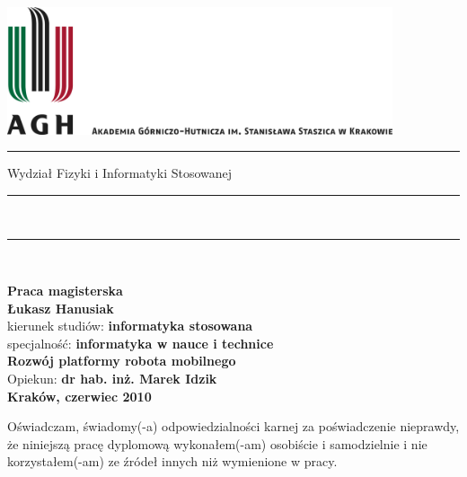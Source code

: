 \documentclass[a4paper,12pt]{article}
\begin{document}
\thispagestyle{empty}
\includegraphics[height=37.5mm]{../images/agh_nzw_a_pl_1w_wbr_rgb_150ppi.jpg}\\
\rule{30mm}{0pt}
{\large \textsf{Wydział Fizyki i Informatyki Stosowanej}}\\
\rule{\textwidth}{3pt}\\
\rule[2ex]
{\textwidth}{1pt}\\
\vspace{7ex}
\begin{center}
{\LARGE \bf \textsf{Praca magisterska}}\\
\vspace{13ex}
{\bf \Large \textsf{Łukasz Hanusiak}}\\
\vspace{3ex}
{\sf\small kierunek studiów:} {\bf\small \textsf{informatyka stosowana}}\\
\vspace{1.5ex}
{\sf\small specjalność:} {\bf\small \textsf{informatyka w nauce i technice}}\\
\vspace{10ex}
{\bf \huge \textsf{Rozwój platformy robota mobilnego}}\\
\vspace{14ex}
{\Large Opiekun: \bf \textsf{dr hab. inż. Marek Idzik}}\\
\vspace{22ex}
{\large \bf \textsf{Kraków, czerwiec 2010}}
\end{center}

\newpage

{\sf Oświadczam, świadomy(-a) odpowiedzialności karnej za poświadczenie nieprawdy, że niniejszą pracę dyplomową wykonałem(-am) osobiście i samodzielnie i  nie korzystałem(-am) ze źródeł innych niż wymienione w pracy.}
\end{document}
